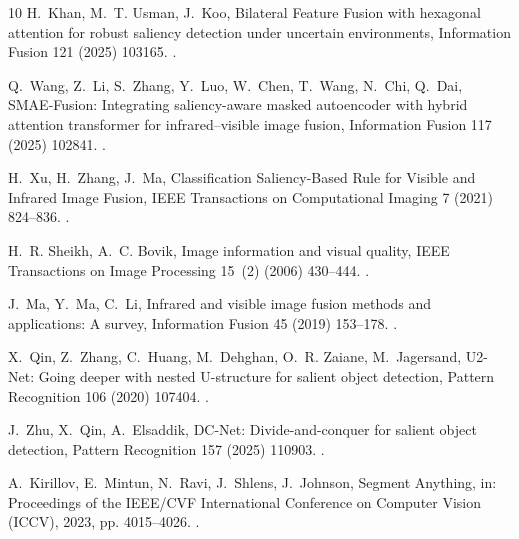 \begin{thebibliography}{10}
H.~Khan, M.~T. Usman, J.~Koo, {Bilateral Feature Fusion with hexagonal
  attention for robust saliency detection under uncertain environments},
  Information Fusion 121 (2025) 103165.
\newblock \href {https://doi.org/10.1016/j.inffus.2025.103165}
  {}.

Q.~Wang, Z.~Li, S.~Zhang, Y.~Luo, W.~Chen, T.~Wang, N.~Chi, Q.~Dai,
  {SMAE-Fusion: Integrating saliency-aware masked autoencoder with hybrid
  attention transformer for infrared–visible image fusion}, Information
  Fusion 117 (2025) 102841.
\newblock \href {https://doi.org/10.1016/j.inffus.2024.102841}
  {}.

H.~Xu, H.~Zhang, J.~Ma, {Classification Saliency-Based Rule for Visible and
  Infrared Image Fusion}, IEEE Transactions on Computational Imaging 7 (2021)
  824--836.
\newblock \href {https://doi.org/10.1109/tci.2021.3100986}
  {}.

H.~R. Sheikh, A.~C. Bovik, {Image information and visual quality}, IEEE
  Transactions on Image Processing 15~(2) (2006) 430--444.
\newblock \href {https://doi.org/10.1109/TIP.2005.859378}
  {}.

J.~Ma, Y.~Ma, C.~Li, {Infrared and visible image fusion methods and
  applications: A survey}, Information Fusion 45 (2019) 153--178.
\newblock \href {https://doi.org/10.1016/j.inffus.2018.02.004}
  {}.

X.~Qin, Z.~Zhang, C.~Huang, M.~Dehghan, O.~R. Zaiane, M.~Jagersand, {U2-Net:
  Going deeper with nested U-structure for salient object detection}, Pattern
  Recognition 106 (2020) 107404.
\newblock \href {https://doi.org/10.1016/j.patcog.2020.107404}
  {}.

J.~Zhu, X.~Qin, A.~Elsaddik, {DC-Net: Divide-and-conquer for salient object
  detection}, Pattern Recognition 157 (2025) 110903.
\newblock \href {https://doi.org/10.1016/j.patcog.2024.110903}
  {}.

A.~Kirillov, E.~Mintun, N.~Ravi, J.~Shlens, J.~Johnson, {Segment Anything}, in:
  Proceedings of the IEEE/CVF International Conference on Computer Vision
  (ICCV), 2023, pp. 4015--4026.
\newblock \href {https://doi.org/10.1109/ICCV51070.2023.00371}
  {}.


\end{thebibliography}
